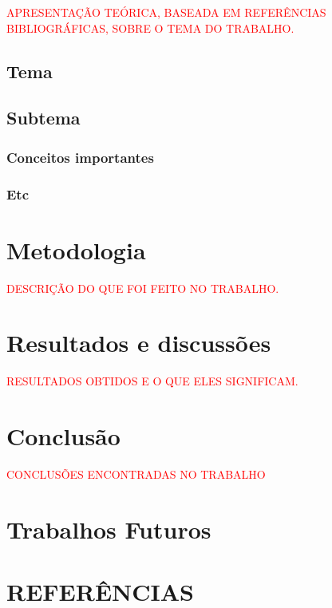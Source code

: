 \documentclass[
  12pt,
  oneside,
  a4paper,
  english,
  brazil]{abntex2}
\newcommand{\PROFESSOR}[1]{\textcolor{red}{\MakeUppercase{#1}}} %
\begin{document}
\PROFESSOR{Apresentação teórica, baseada em referências bibliográficas, sobre o tema do trabalho.}

\section{Tema}\label{tema}

\section{Subtema}\label{subtema}

\subsection{Conceitos importantes}\label{conceitos-importantes}

\subsection{Etc}\label{etc}

\chapter{Metodologia}

\PROFESSOR{Descrição do que foi feito no trabalho.}

\chapter{Resultados e discussões}

\PROFESSOR{Resultados obtidos e o que eles significam.}

\chapter{Conclusão}

\PROFESSOR{Conclusões encontradas no trabalho}

\chapter{Trabalhos Futuros}

\chapter*{REFERÊNCIAS}
\end{document}
